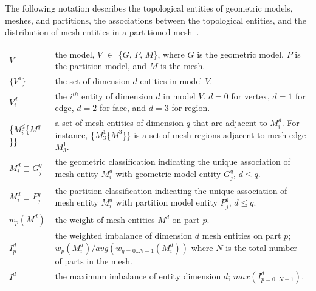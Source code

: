 \newpage

The following notation describes the topological entities of geometric models,
meshes, and partitions, the associations between the topological entities, and
the distribution of mesh entities in a partitioned mesh~\cite{ibanez2016pumi}.
\\

\begin{tabular}{l|p{10cm}}
$V$                         & the model, $V$ $\in$ \{$G$, $P$, $M$\}, where
                              $G$ is the geometric model, $P$
                              is the partition model, and $M$
                              is the mesh.
                              \\
$\{V^d\}$                   & the set of dimension $d$ entities in model $V$.\\
$V^d_i$                     & the $i^{th}$ entity of dimension $d$ in model
                              $V$.
                              $d=0$ for vertex, $d=1$ for edge, $d=2$ for
                              face, and $d=3$ for region.\\
\{$M^d_i$\{$M^q$\}\}        & a set of mesh entities of dimension $q$ that
                              are adjacent to $M^d_i$. For instance,
                              \{$M^1_3$\{$M^3$\}\} is a set of mesh regions
                              adjacent to mesh edge $M^1_3$. \\
$M^{d}_i \sqsubset G^{q}_j$ & the geometric classification indicating the
                              unique association of mesh entity $M^{d}_i$
                              with geometric model entity
                              $G^{q}_j$, $d \le q$.\\
$M^{d}_i \sqsubset P^{q}_j$ & the partition classification indicating the
                              unique association of mesh entity $M^{d}_i$
                              with partition model entity
                              $P^{q}_j$, $d \le q$.\\
$w_p(M^d)$                  & the weight of mesh entities $M^d$ on part $p$.\\
$I^d_p$                     & the weighted imbalance of dimension $d$ mesh entities
                              on part $p$;
                              $w_p(M^d_i) / avg(w_{q=0..N-1}(M^d_i))$
                              where $N$ is the total number of parts in the
                              mesh.\\
$I^d$                       & the maximum imbalance of entity dimension $d$;
                              $max(I^d_{p=0..N-1})$.
\end{tabular}
